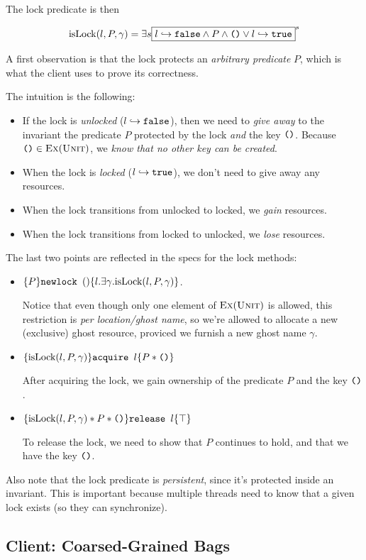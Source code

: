 The lock predicate is then

\[ \text{isLock}{(l, P, \gamma)} = \exists{s}{\fbox{$l \hookrightarrow \texttt{false} \land P \land \texttt{()} \lor l \hookrightarrow \texttt{true}  $}^{s}} \]

A first observation is that the lock protects an \emph{arbitrary predicate} $P$, which is what the client uses to prove its correctness.

The intuition is the following:
\begin{itemize}

\item If the lock is \emph{unlocked} ($l \hookrightarrow \texttt{false}$), then we need to \emph{give away} to the invariant the predicate $P$ protected by the lock \emph{and} the key $\texttt{()}$. Because $\texttt{()} \in \textsc{Ex}(\textsc{Unit})$, we \emph{know that no other key can be created}.

\item When the lock is \emph{locked} ($l \hookrightarrow \texttt{true}$), we don't need to give away any resources.

\item When the lock transitions from unlocked to locked, we \emph{gain} resources.

\item When the lock transitions from locked to unlocked, we \emph{lose} resources.

\end{itemize}

The last two points are reflected in the specs for the lock methods:

\begin{itemize}

\item $\{P\} \texttt{newlock } () \{l.  \exists \gamma. \text{isLock}{(l, P, \gamma)}\}$.

Notice that even though only one element of $\textsc{Ex}(\textsc{Unit})$ is allowed, this restriction is \emph{per location/ghost name}, so we're allowed to allocate a new (exclusive) ghost resource, proviced we furnish a new ghost name $\gamma$.

\item $\{\text{isLock}{(l, P, \gamma)}\} \texttt{acquire } l \{P * \texttt{()}\}$

After acquiring the lock, we gain ownership of the predicate $P$ and the key $\texttt{()}$.

\item $\{\text{isLock}{(l, P, \gamma)} * P * \texttt{()}\} \texttt{release } l \{\top\}$

To release the lock, we need to show that $P$ continues to hold, and that we have the key $\texttt{()}$.

\end{itemize}

Also note that the lock predicate is \emph{persistent}, since it's protected inside an invariant. This is important because multiple threads need to know that a given lock exists (so they can synchronize).

\subsection{Client: Coarsed-Grained Bags}